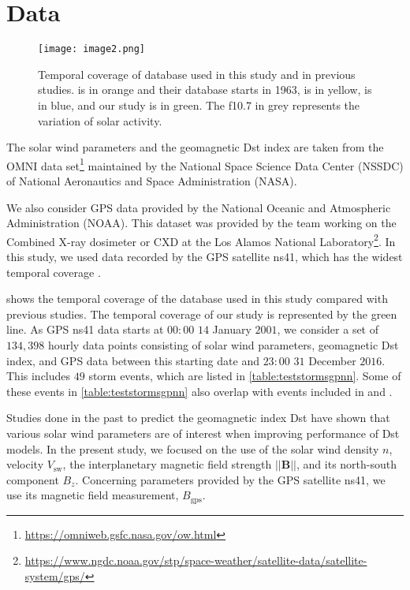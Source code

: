 \section{Data}\label{sec:datagpnn}

\begin{figure}
	\texttt{[image: image2.png]}
	\caption{Temporal coverage of database used in this study and in previous studies. \citet{wu1997geomagnetic} 
	is in orange and their database starts in 1963, \citet{Bala2012} is in yellow, \citet{Lazzus} is in blue, and our study is in green. 
	The f10.7 in grey represents the variation of solar activity.}
	\label{fig:datacoverage}
\end{figure}


The solar wind parameters and the geomagnetic Dst index are taken from the OMNI data 
set\footnote{\url{https://omniweb.gsfc.nasa.gov/ow.html}} maintained by the National Space Science 
Data Center (NSSDC) of National Aeronautics and Space Administration (NASA).

We also consider GPS data provided by the National Oceanic and Atmospheric Administration 
(NOAA). This dataset was provided by the team working on the Combined X-ray dosimeter or CXD at the 
Los Alamos National 
Laboratory\footnote{
	\url{https://www.ngdc.noaa.gov/stp/space-weather/satellite-data/satellite-system/gps/}
}. 
In this study, we used data recorded by the GPS satellite ns41, which has the widest 
temporal coverage \citep{morley2017energetic}. 

 shows the temporal coverage of the database used in this study compared 
with previous studies. The temporal coverage of our study is represented by the green line. As GPS 
ns41 data starts at $00:00$ $14$ January $2001$, we consider a set of $134,398$ hourly data points 
consisting of solar wind parameters, geomagnetic Dst index, and GPS data between this starting 
date and $23:00$ $31$ December $2016$. This includes $49$ storm events, which are listed in 
\cref{table:teststormsgpnn}. Some of these events in \cref{table:teststormsgpnn} also overlap with 
events included in \citet{Ji2012} and \citet{ChandorkarDst}. 

Studies done in the past to predict the geomagnetic index Dst have shown that various solar wind 
parameters are of interest when improving performance of Dst models. In the present study, we 
focused on the use of the solar wind density $n$, velocity $V_{\text{sw}}$, the interplanetary 
magnetic field strength $\rvert\rvert\mathbf{B}\rvert\rvert$, and its north-south component 
$B_{z}$. Concerning parameters provided by the GPS satellite ns41, we use its magnetic field
measurement, $B_{\text{gps}}$.

